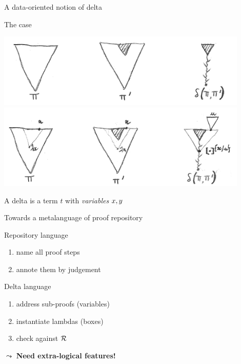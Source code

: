 \documentclass[ignorenonframetext,red]{beamer}
\begin{document}
\begin{frame}{A data-oriented notion of delta}
  \begin{block}{The  case}
    \begin{overlayarea}{\textwidth}{10em}
      {\vspace{0.6em}\centering\includegraphics[width=0.90\textwidth]{images/delta.png}\\}%
      {\hspace{1em}\centering\includegraphics[width=0.90\textwidth]{images/delta2.png}\\}%
    \end{overlayarea}
    \begin{overlayarea}\textwidth{3em}
      A delta is a term $t$ with \emph{variables} \alert{$x, y $}
    \end{overlayarea}
  \pause
  \end{block}
\end{frame}

\begin{frame}{Towards a metalanguage of proof repository}
  \begin{block}{Repository language}
    \begin{enumerate}
    \item name all proof steps
    \item annote them by judgement
    \end{enumerate}
  \end{block}
  \begin{block}{Delta language}
    \begin{enumerate}
    \item address sub-proofs (variables)
    \item instantiate lambdas (boxes)
    \item check against $\mathcal{R}$
    \end{enumerate}
  \end{block}
  \pause
  $\leadsto$ \bf Need extra-logical features!
\end{frame}
\end{document}
